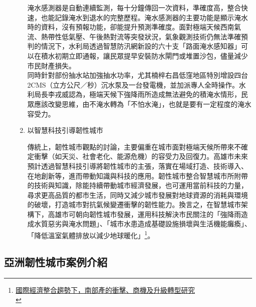 \documentclass[a4paper,12pt]{article}
\begin{document}
\begin{enumerate}
\begin{enumerate}
淹水感測器是自動連續監測，每十分鐘傳回一次資料，準確度高，整合快速，也能記錄淹水到退水的完整歷程。淹水感測器的主要功能是顯示淹水時的資料，沒有預報功能，卻能提升預測準確度。面對極端天候西南氣流、熱帶性低氣壓、午後熱對流等突發狀況，氣象觀測技術仍無法準確預判的情況下，水利局透過智慧防汛網新設的六十支「路面淹水感知器」可以在積水初期立即通報，讓民眾提早安裝防水閘門或堆置沙包，儘量減少市民財產損失。\\

同時針對部份抽水站加強抽水功率，尤其楠梓右昌低窪地區特別增設四台2CMS（立方公尺／秒）沉水泵及一台發電機，並加派專人全時操作。水利局長李戎威認為，極端天候下強降雨所造成無法避免的積淹水情形，民眾應該改變思維，由不淹水轉為「不怕水淹」，也就是要有一定程度的淹水容受力。\\
\item 以智慧科技引導韌性城市
\label{sec:org04fe7a3}

傳統上，韌性城市觀點的討論，主要偏重在城市面對極端天候所帶來不確定衝擊（如天災、社會老化、能源危機）的容受力及回復力。高雄市未來預計透過智慧科技引導將韌性城市的主張，落實在場域打造、技術導入、在地創新等，進而帶動知識與科技的應用。韌性城市整合智慧城市所附帶的技術與知識，除能持續帶動城市經濟發展，也可運用當前科技的力量，尋求更高品質的都市生活，同時又減少城市發展對地球資源的消耗與環境的破壞，打造城市對抗氣候變遷衝擊的韌性能力。換言之，在智慧城市架構下，高雄市可朝向韌性城市發展，運用科技解決市民關注的「強降雨造成水質惡劣與淹水問題」、「城市水患造成基礎設施損壞與生活機能癱瘓」、「降低溫室氣體排放以減少地球暖化」\footnote{\href{https://www.moea.gov.tw/Mns/populace/information/wHandInformation\_File.ashx?info\_id=1169}{國際經濟整合趨勢下，南部產的衝擊、商機及升級轉型研究}\\}。\\
\newpage
\end{enumerate}
\end{enumerate}

\subsection{亞洲韌性城市案例介紹}
\label{sec:orgfc73110}
\end{document}
